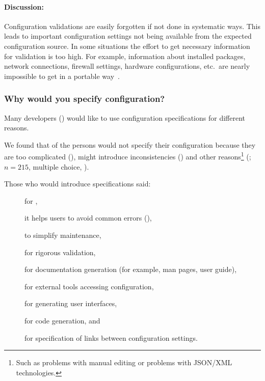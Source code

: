 \paragraph{Discussion:}
Configuration validations are easily forgotten if not done in systematic ways.
This leads to important configuration settings not being available from the expected configuration source.
In some situations the effort to get necessary information for validation is too high.
For example, information about installed packages, network connections, firewall settings, hardware configurations, etc.\ are nearly impossible to get in a portable way~\cite{raab2017challenges}.



\subsubsection{Why would you specify configuration?}

\begin{finding}
Many developers () would like to use configuration specifications for different reasons.
\end{finding}

\methodQuestion{}
We found that  of the persons would not specify their configuration because they are too complicated (), might introduce inconsistencies () and other reasons\footnote{Such as problems with manual editing or problems with JSON/XML technologies.} (; $n=215$, multiple choice, ).



Those who would introduce specifications said:
\begin{description}
\item[] for ,
\item[] it helps users to avoid common errors (),
\item[] to simplify maintenance,
\item[] for rigorous validation,
\item[] for documentation generation (for example, man pages, user guide),
\item[] for external tools accessing configuration,
\item[] for generating user interfaces,
\item[] for code generation, and
\item[] for specification of links between configuration settings.
\end{description}

